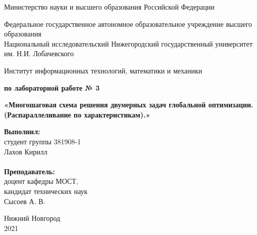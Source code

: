 \documentclass{report}
\begin{document}
\begin{titlepage}

\begin{center}
Министерство науки и высшего образования Российской Федерации
\end{center}

\begin{center}
Федеральное государственное автономное образовательное учреждение высшего образования \\
Национальный исследовательский Нижегородский государственный университет им. Н.И. Лобачевского
\end{center}

\begin{center}
Институт информационных технологий, математики и механики
\end{center}

\vspace{4em}

\begin{center}
\textbf{ по лабораторной работе № 3} \\
\end{center}
\begin{center}
\textbf{\Large«Многошаговая схема решения двумерных задач глобальной оптимизации. 
(Распараллеливание по характеристикам).»} \\
\end{center}

\vspace{4em}

\newbox{\lbox}
\newlength{\maxl}
\setlength{\maxl}{\wd\lbox}
\hfill\parbox{7cm}{
\hspace*{5cm}\hspace*{-5cm}\textbf{Выполнил:} \\ студент группы 381908-1 \\ Лахов Кирилл\\
\\
\hspace*{5cm}\hspace*{-5cm}\textbf{Преподаватель:}\\ доцент кафедры МОСТ, \\ кандидат технических наук \\ Сысоев А. В.\\
}
\vspace{\fill}

\begin{center} Нижний Новгород \\ 2021 \end{center}

\end{titlepage}
\end{document}
